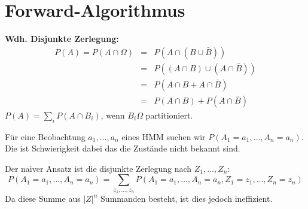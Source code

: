 \section{Forward-Algorithmus}
\begin{shaded}
	\noindent
	\textbf{Wdh. Disjunkte Zerlegung:}
	\begin{eqnarray*}
		P(A) = P(A \cap \Omega) &=& P(A \cap (B \cup \bar{B}))\\
								&=& P((A \cap B) \cup (A \cap \bar{B}))\\
								&=& P(A \cap B + A \cap \bar{B})\\
								&=& P(A \cap B)+P(A \cap \bar{B})
	\end{eqnarray*}
	\(P(A) = \sum_i P(A \cap B_i)\), wenn \(B_i \Omega\) partitioniert.
	\begin{center}
	\end{center}
\end{shaded}
Für eine Beobachtung \(a_1, \dots, a_n\) eines HMM suchen wir \(P(A_1=a_1, \dots, A_n=a_n)\).
Die ist Schwierigkeit dabei das die Zustände nicht bekannt sind.

Der naiver Ansatz ist die disjunkte Zerlegung nach \(Z_1, \dots, Z_n\):
\[P(A_1=a_1, \dots, A_n=a_n) = \sum\limits_{z_1, \dots, z_n} P(A_1=a_1, \dots, A_n=a_n, Z_1=z_1, \dots, Z_n=z_n)\]
Da diese Summe aus \(|Z|^n\) Summanden besteht, ist dies jedoch ineffizient.

